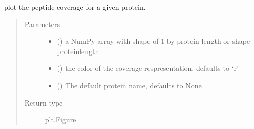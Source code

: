 \documentclass[letterpaper,10pt,english]{sphinxmanual}
\begin{document}
\begin{fulllineitems}
\label{\detokenize{IPTK.Visualization:IPTK.Visualization.vizTools.plot_protein_coverage}}
plot the peptide coverage for a given protein.
\begin{quote}\begin{description}
\item[{Parameters}] \leavevmode\begin{itemize}
\item {} 
 () \textendash{} a NumPy array with shape of 1 by protein length or shape protein\sphinxhyphen{}length

\item {} 
 (\sphinxstyleliteralemphasis{\sphinxupquote{, }}) \textendash{} the color of the coverage respresentation, defaults to ‘r’

\item {} 
 (\sphinxstyleliteralemphasis{\sphinxupquote{, }}) \textendash{} The default protein name, defaults to None

\end{itemize}

\item[{Return type}] \leavevmode
plt.Figure

\end{description}\end{quote}

\end{fulllineitems}

\end{document}
